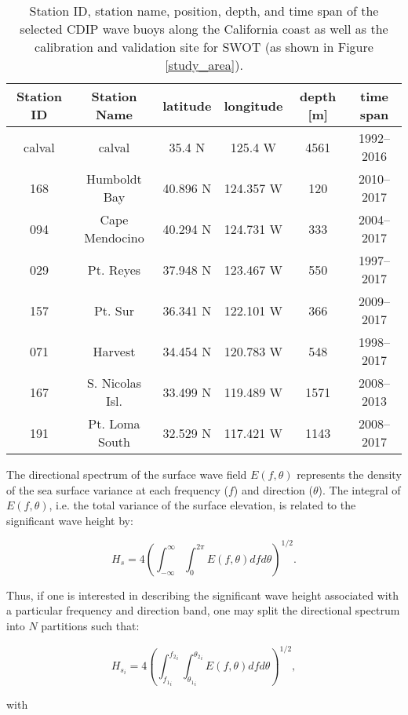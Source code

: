 \begin{table}
\caption{Station ID, station name, position, depth, and time span of the selected CDIP wave buoys along the California coast as well as the calibration and validation site for SWOT (as shown in Figure \ref{study_area}).}
\centering
\begin{tabular}{c c c c c c}
\hline
Station ID  & Station Name & latitude & longitude & depth [m] & time span\\
\hline
\hline
calval & calval &35.4 N & 125.4 W &  4561 & 1992--2016\\
168 & Humboldt Bay &40.896 N & 124.357 W &  120 & 2010--2017\\
094 & Cape Mendocino &40.294 N & 124.731 W &  333 & 2004--2017\\
029 & Pt. Reyes &37.948 N & 123.467 W &  550 & 1997--2017\\
157 & Pt. Sur & 36.341 N &  122.101 W &  366 & 2009--2017\\
071 & Harvest &34.454 N & 120.783 W &  548 & 1998--2017\\
167 & S. Nicolas Isl. &33.499 N & 119.489 W &  1571 & 2008--2013\\
191 &  Pt. Loma South & 32.529 N & 117.421 W &  1143 & 2008--2017\\
\hline
\end{tabular}
\label{stations}
\end{table}

The directional spectrum of the surface wave field $E(f,\theta)$ represents the density of the sea surface variance at each frequency ($f$) and direction ($\theta$). The integral of $E(f,\theta)$, i.e. the total variance of the surface elevation, is related to the significant wave height by: 

\begin{equation}
H_s = 4 \left(\int_{-\infty}^{\infty} \int_{0}^{2\pi} E(f,\theta)df d\theta\right)^{1/2}.
\end{equation}

\noindent Thus, if one is interested in describing the significant wave height associated with a particular frequency and direction band, one may split the directional spectrum into $N$ partitions such that:
 
\begin{equation}
H_{s_i} = 4 \left(\int_{{f_1}_i}^{{f_2}_i} \int_{{\theta_1}_i}^{{\theta_2}_i} E(f,\theta)df d\theta\right)^{1/2},\label{part_hs}
\end{equation}

\noindent with

